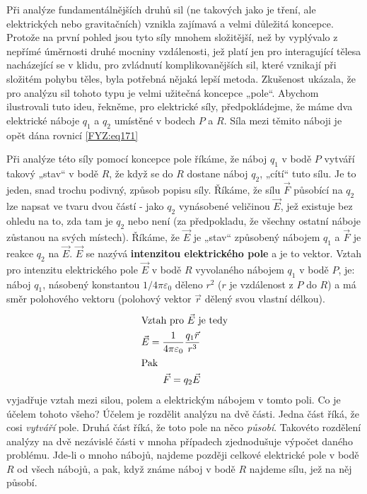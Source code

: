     Při analýze fundamentálnějších druhů sil (ne takových jako je tření, ale elektrických nebo 
    gravitačních) vznikla zajímavá a velmi důležitá koncepce. Protože na první pohled jsou tyto 
    síly mnohem složitější, než by vyplývalo z nepřímé úměrnosti druhé mocniny vzdálenosti, jež 
    platí jen pro interagující tělesa nacházející se v klidu, pro zvládnutí komplikovanějších sil, 
    které vznikají při složitém pohybu těles, byla potřebná nějaká lepší metoda. Zkušenost ukázala, 
    že pro analýzu sil tohoto typu je velmi užitečná koncepce „pole“. Abychom ilustrovali tuto 
    ideu, řekněme, pro elektrické síly, předpokládejme, že máme dva elektrické náboje \(q_1\) a 
    \(q_2\) umístěné v bodech \(P\) a \(R\). Síla mezi těmito náboji je opět dána rovnicí 
    \ref{FYZ:eq171}
    
    Při analýze této síly pomocí koncepce pole říkáme, že náboj \(q_1\) v bodě \(P\) vytváří takový 
    „stav“ v bodě \(R\), že když se do \(R\) dostane náboj \(q_2\), „cítí“ tuto sílu. Je to jeden, 
    snad trochu podivný, způsob popisu síly. Říkáme, že sílu \(\vec{F}\) působící na \(q_2\) lze 
    napsat ve tvaru dvou částí - jako \(q_2\) vynásobené veličinou \(\vec{E}\), jež existuje bez 
    ohledu na to, zda tam je \(q_2\) nebo není (za předpokladu, že všechny ostatní náboje zůstanou 
    na svých místech). Říkáme, že  \(\vec{E}\) je „stav“ způsobený nábojem \(q_1\) a \(\vec{F}\) je 
    reakce \(q_2\) na \(\vec{E}\). \(\vec{E}\) se nazývá \textbf{intenzitou elektrického pole} a je 
    to vektor. Vztah pro intenzitu elektrického pole \(\vec{E}\) v bodě \(R\) vyvolaného nábojem 
    \(q_1\) v bodě \(P\), je: náboj \(q_1\), násobený konstantou \(1/4\pi\varepsilon_0\) děleno 
    \(r^2\) (\(r\) je vzdálenost z \(P\) do \(R\)) a má směr polohového vektoru (polohový vektor 
    \(\vec{r}\) dělený svou vlastní délkou).
    \begin{align}
      \shortintertext{Vztah pro \(\vec{E}\) je tedy}
      \vec{E} = \frac{1}{4\pi\varepsilon_0}\frac{q_1\vec{r}}{r^3}   \label{FYZ:eq172} \\
      \shortintertext{Pak}
      \vec{F} = q_2\vec{E}                                          \label{FYZ:eq173}
    \end{align}
    vyjadřuje vztah mezi silou, polem a elektrickým nábojem v tomto poli. Co je účelem tohoto 
    všeho? Účelem je rozdělit analýzu na dvě části. Jedna část říká, že cosi \emph{vytváří} pole. 
    Druhá část říká, že toto pole na něco \emph{působí}. Takovéto rozdělení analýzy na dvě 
    nezávislé části v mnoha případech zjednodušuje výpočet daného problému. Jde-li o mnoho nábojů, 
    najdeme později celkové elektrické pole v bodě \(R\) od všech nábojů, a pak, když známe náboj v 
    bodě \(R\) najdeme sílu, jež na něj působí.
    
